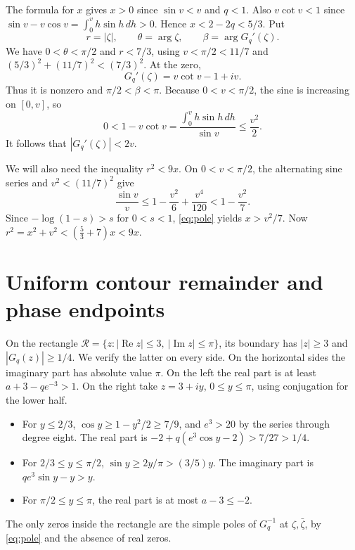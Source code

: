 \documentclass[11pt]{article}
\begin{document}
The formula for \(x\) gives \(x>0\) since \(\sin v<v\) and \(q<1\). Also \(v\cot v<1\) since \(\sin v-v\cos v=\int_0^v h\sin h\,dh>0\). Hence \(x<2-2q<5/3\). Put
\[
 r=|\zeta|,\qquad \theta=\arg\zeta,\qquad \beta=\arg G_q'(\zeta).
\]
We have \(0<\theta<\pi/2\) and \(r<7/3\), using \(v<\pi/2<11/7\) and
\((5/3)^2+(11/7)^2<(7/3)^2\).
At the zero,
\[
 G_q'(\zeta)=v\cot v-1+iv .
\]
Thus it is nonzero and \(\pi/2<\beta<\pi\). Because \(0<v<\pi/2\), the sine is increasing on \([0,v]\), so
\[
 0<1-v\cot v=\frac{\int_0^v h\sin h\,dh}{\sin v}\le \frac{v^2}{2}.
\]
It follows that \(|G_q'(\zeta)|<2v\).

We will also need the inequality \(r^2<9x\). On \(0<v<\pi/2\), the alternating sine series and \(v^2<(11/7)^2\) give
\[
 \frac{\sin v}{v}
 \le 1-\frac{v^2}{6}+\frac{v^4}{120}<1-\frac{v^2}{7}.
\]
Since \(-\log(1-s)>s\) for \(0<s<1\), \eqref{eq:pole} yields \(x>v^2/7\). Now
\(r^2=x^2+v^2<(\tfrac53+7)x<9x\).

\section{Uniform contour remainder and phase endpoints}

On the rectangle \(\mathcal R=\{z:|\operatorname{Re}z|\le3,\ |\operatorname{Im}z|\le\pi\}\), its boundary has \(|z|\ge3\) and \(|G_q(z)|\ge1/4\). We verify the latter on every side. On the horizontal sides the imaginary part has absolute value \(\pi\). On the left the real part is at least \(a+3-qe^{-3}>1\). On the right take \(z=3+iy\), \(0\le y\le\pi\), using conjugation for the lower half.
\begin{itemize}
 \item For \(y\le2/3\), \(\cos y\ge 1-y^2/2\ge7/9\), and \(e^3>20\) by the series through degree eight. The real part is \(-2+q(e^3\cos y-2)>7/27>1/4\).
 \item For \(2/3\le y\le\pi/2\), \(\sin y\ge 2y/\pi>(3/5)y\). The imaginary part is \(qe^3\sin y-y>y\).
 \item For \(\pi/2\le y\le\pi\), the real part is at most \(a-3\le-2\).
\end{itemize}
The only zeros inside the rectangle are the simple poles of \(G_q^{-1}\) at \(\zeta,\bar\zeta\), by \eqref{eq:pole} and the absence of real zeros.
\end{document}
